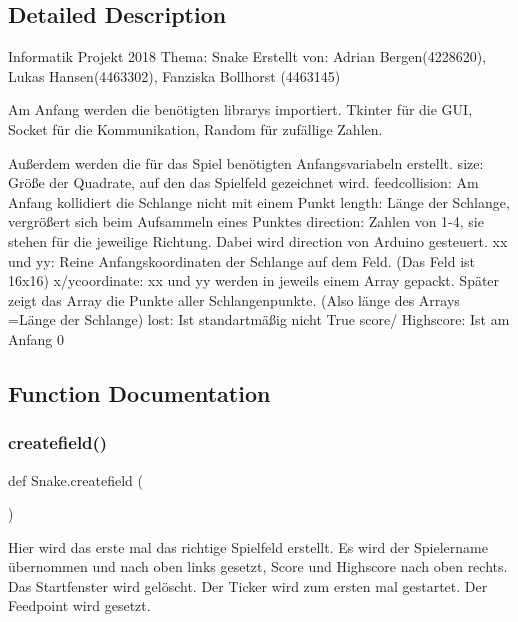 \subsection{Detailed Description}
\begin{DoxyVerb}Informatik Projekt 2018
Thema:  Snake
Erstellt von: Adrian Bergen(4228620), Lukas Hansen(4463302), Fanziska Bollhorst (4463145)

Am Anfang werden die benötigten librarys importiert. Tkinter für die GUI,
Socket für die Kommunikation, Random für zufällige Zahlen.

Außerdem werden die für das Spiel benötigten Anfangsvariabeln erstellt.
size: Größe der Quadrate, auf den das Spielfeld gezeichnet wird.
feedcollision: Am Anfang kollidiert die Schlange nicht mit einem Punkt
length: Länge der Schlange, vergrößert sich beim Aufsammeln eines Punktes
direction: Zahlen von 1-4, sie stehen für die jeweilige Richtung.
Dabei wird direction von Arduino gesteuert.
xx und yy: Reine Anfangskoordinaten der Schlange auf dem Feld.
(Das Feld ist 16x16)
x/ycoordinate: xx und yy werden in jeweils einem Array gepackt.
Später zeigt das Array die Punkte aller Schlangenpunkte.
(Also länge des Arrays =Länge der Schlange)
lost: Ist standartmäßig nicht True
score/ Highscore: Ist am Anfang 0
\end{DoxyVerb}
 

\subsection{Function Documentation}
\mbox{\label{namespace_snake_a91223592dfcc9c233f9d7c5b16809456}} 
\subsubsection{\texorpdfstring{createfield()}{createfield()}}
{\footnotesize\ttfamily def Snake.\+createfield (\begin{DoxyParamCaption}{ }\end{DoxyParamCaption})}

\begin{DoxyVerb}Hier wird das erste mal das richtige Spielfeld erstellt. Es wird der Spielername übernommen
und nach oben links gesetzt, Score und Highscore nach oben rechts. Das Startfenster wird gelöscht.
Der Ticker wird zum ersten mal gestartet. Der Feedpoint wird gesetzt.
\end{DoxyVerb}
 \mbox{\label{namespace_snake_a8f6d4da01109c97d36f9a18d5a0bb0b3}} 
